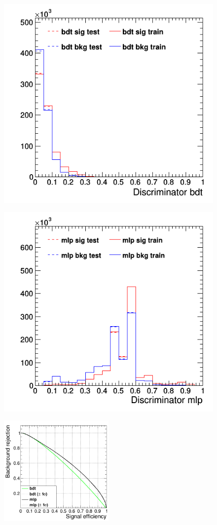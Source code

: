 \documentclass[11pt]{scrartcl}
\begin{document}
	\begin{figure}[H]
	\centering
	\begin{minipage}{.5\textwidth}
	  \centering
	  \includegraphics[width=0.75\linewidth]{figures/MVA/select3/config2/discriminator_bdt.png}
	  \label{fig:distr_s3_config2_bdt}
	\end{minipage}%
	\begin{minipage}{.5\textwidth}
	  \centering
	  \includegraphics[width=0.75\linewidth]{figures/MVA/select3/config2/discriminator_mlp.png}
	  \label{fig:distr_s3_config2_mlp}
	\end{minipage}
	\centering
	\includegraphics[width=0.5\textwidth]{figures/MVA/select3/config2/FOM_selection3_nL7_nT800_mD3_nC20.png}

\end{figure}
\end{document}

